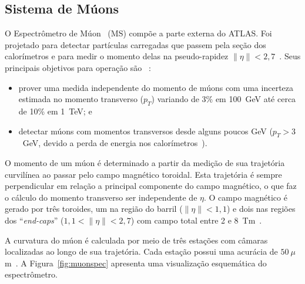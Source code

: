 \subsection{Sistema de Múons}

O Espectrômetro de Múon ~(MS) compõe a parte externa do ATLAS. Foi projetado
para detectar partículas carregadas que passem pela seção dos calorímetros e
para medir o momento delas na pseudo-rapidez $\|\eta\| < 2,7$~\cite{ATLAS2008}.
Seus principais objetivos para operação são ~\cite{Aad:1275998}:

\begin{itemize}
    \item prover uma medida independente do momento de múons com uma incerteza
    estimada no momento transverso ($p_T$) variando de 3\% em 100~GeV até cerca
    de 10\% em 1~TeV; e 
    \item detectar múons com momentos transversos desde alguns poucos GeV
    (\mbox{$p_T > 3$~GeV}, devido a perda de energia nos
    calorímetros~\cite{ATLAS2008}).
\end{itemize}

O momento de um  múon é determinado a partir da medição de sua trajetória
curvilínea ao passar pelo campo magnético toroidal. Esta trajetória é sempre
perpendicular em relação a principal componente do campo magnético,  o que faz
o cálculo do momento transverso ser independente de $\eta$. O campo magnético é
gerado por três toroides, um na região do barril ($\|\eta\| < 1,1$) e dois nas
regiões dos ``\emph{end-caps}'' ($1,1 < \|\eta\| < 2,7$) com campo total entre 2
e 8~Tm~\cite{Aad:1275998}.

A curvatura do múon é calculada por meio de três estações com câmaras
localizadas ao longo de sua trajetória. Cada estação possui uma acurácia de
$50~\mu$m~\cite{MUONTDR1997}. A Figura~\ref{fig:muonspec} apresenta uma
visualização esquemática do espectrômetro.



